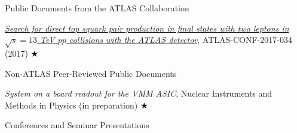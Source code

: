 \begin{minipage}{0.8\textwidth}
\vspace{0.25in}
\hspace{0.2in}Public Documents from the ATLAS Collaboration

\hspace{0.35in}
\begin{minipage}{1.0\textwidth}

\vspace{0.15in}
\href{https://atlas.web.cern.ch/Atlas/GROUPS/PHYSICS/CONFNOTES/ATLAS-CONF-2017-034/}{\textit{Search for direct top
squark pair production in final states with two leptons in $\sqrt{s} = 13$ TeV $pp$ collisions with the ATLAS detector}}, ATLAS-CONF-2017-034 (2017) $\bigstar$

\end{minipage}

\vspace{0.25in}
\hspace{0.2in}Non-ATLAS Peer-Reviewed Public Documents

\hspace{0.35in}
\begin{minipage}{1.0\textwidth}
\vspace{0.15in}
\textit{System on a board readout for the VMM ASIC}, Nuclear Instruments and Methods in Physics (in preparation) $\bigstar$

\end{minipage}


\end{minipage}

\newpage
{\Large Conferences and Seminar Presentations}\\
\HRule

\vspace{0.15in}

